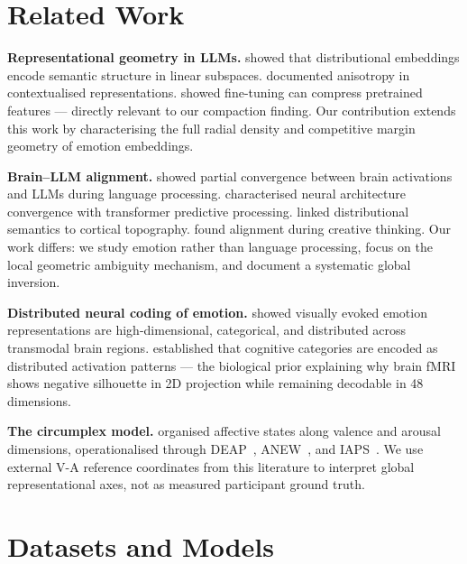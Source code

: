 \documentclass{article}
\begin{document}
\section{Related Work}

\textbf{Representational geometry in LLMs.}
\citet{mikolov2013} showed that distributional embeddings encode semantic structure in
linear subspaces.
\citet{ethayarajh2019} documented anisotropy in contextualised representations.
\citet{kumar2022} showed fine-tuning can compress pretrained features --- directly
relevant to our compaction finding.
Our contribution extends this work by characterising the full radial density and
competitive margin geometry of emotion embeddings.

\textbf{Brain--LLM alignment.}
\citet{caucheteux2022} showed partial convergence between brain activations and LLMs
during language processing.
\citet{schrimpf2021} characterised neural architecture convergence with transformer
predictive processing.
\citet{huth2016} linked distributional semantics to cortical topography.
\citet{ismayilzada2026} found alignment during creative thinking.
Our work differs: we study emotion rather than language processing, focus on the local
geometric ambiguity mechanism, and document a systematic global inversion.

\textbf{Distributed neural coding of emotion.}
\citet{horikawa2020} showed visually evoked emotion representations are high-dimensional,
categorical, and distributed across transmodal brain regions.
\citet{haxby2001} established that cognitive categories are encoded as distributed
activation patterns --- the biological prior explaining why brain fMRI shows negative
silhouette in 2D projection while remaining decodable in 48 dimensions.

\textbf{The circumplex model.}
\citet{russell1980} organised affective states along valence and arousal dimensions,
operationalised through DEAP~\citep{koelstra2012}, ANEW~\citep{bradley1999}, and
IAPS~\citep{lang2008}.
We use external V-A reference coordinates from this literature to interpret global
representational axes, not as measured participant ground truth.

\section{Datasets and Models}
\end{document}
